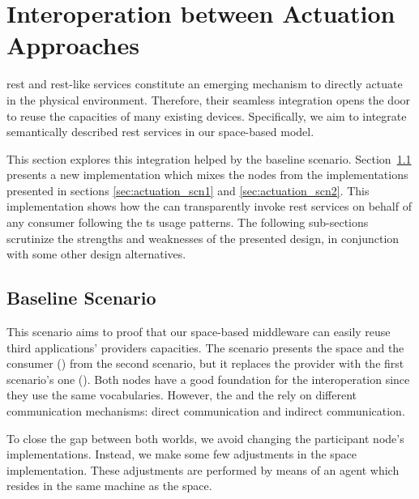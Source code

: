 \section{Interoperation between Actuation Approaches} %
\label{sec:actuation_discussion}

\ac{rest} and \ac{rest}-like services constitute an emerging mechanism to directly actuate in the physical environment.
Therefore, their seamless integration opens the door to reuse the capacities of many existing devices. %
Specifically, we aim to integrate semantically described \ac{rest} services in our space-based model. %


This section explores this integration helped by the baseline scenario.
Section~\ref{sec:actuation_scn3} presents a new implementation which mixes the nodes from the implementations presented in sections \ref{sec:actuation_scn1} and \ref{sec:actuation_scn2}.
This implementation shows how the \Space{} can transparently invoke \ac{rest} services on behalf of any consumer following the \ac{ts} usage patterns. %
The following sub-sections scrutinize the strengths and weaknesses of the presented design, in conjunction with some other design alternatives. %


\subsection{Baseline Scenario}
\label{sec:actuation_scn3}

This scenario aims to proof that our space-based middleware can easily reuse third applications' providers capacities. %
The scenario presents the space and the consumer (\nodeConsSpace{}) from the second scenario, but it replaces the provider with the first scenario's one (\nodeProvRest{}).
Both nodes have a good foundation for the interoperation since they use the same vocabularies. %
However, the \nodeProvRest{} and the \nodeConsSpace{} rely on different communication mechanisms: direct communication and indirect communication.


To close the gap between both worlds, we avoid changing the participant node's implementations.
Instead, we make some few adjustments in the space implementation.
These adjustments are performed by means of an agent which resides in the same machine as the space. %



